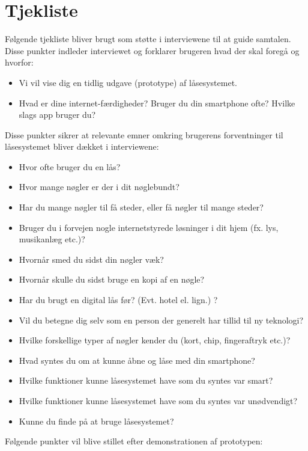 \documentclass[a4paper,12pt]{article}
\begin{document}
\appendix
\section{Tjekliste}
Følgende tjekliste bliver brugt som støtte i interviewene til at guide samtalen. \\
Disse punkter indleder interviewet og forklarer brugeren hvad der skal foregå og hvorfor:

\begin{itemize}
    \item Vi vil vise dig en tidlig udgave (prototype) af låsesystemet.
    \item Hvad er dine internet-færdigheder? Bruger du din smartphone ofte? Hvilke slags app bruger du?
\end{itemize}

Disse punkter sikrer at relevante emner omkring brugerens forventninger til låsesystemet bliver dækket i interviewene:

\begin{itemize}
    \item Hvor ofte bruger du en lås?
    \item Hvor mange nøgler er der i dit nøglebundt?
    \item Har du mange nøgler til få steder, eller få nøgler til mange steder?
    \item Bruger du i forvejen nogle internetstyrede løsninger i dit hjem (fx. lys, musikanlæg etc.)?
    \item Hvornår smed du sidst din nøgler væk?
    \item Hvornår skulle du sidst bruge en kopi af en nøgle?
    \item Har du brugt en digital lås før? (Evt. hotel el. lign.) ?
    \item Vil du betegne dig selv som en person der generelt har tillid til ny teknologi?
    \item Hvilke forskellige typer af nøgler kender du (kort, chip, fingeraftryk etc.)?
    \item Hvad syntes du om at kunne åbne og låse med din smartphone?
    \item Hvilke funktioner kunne låsesystemet have som du syntes var smart?
    \item Hvilke funktioner kunne låsesystemet have som du syntes var unødvendigt?
    \item Kunne du finde på at bruge låsesystemet?
\end{itemize}
Følgende punkter vil blive stillet efter demonstrationen af prototypen:
\end{document}
